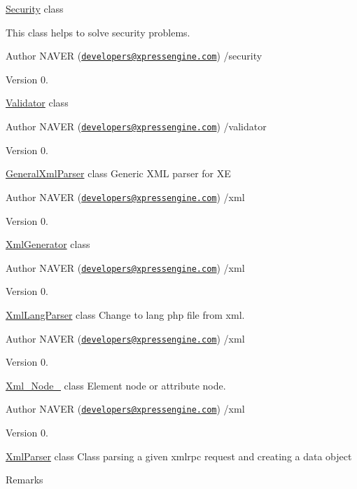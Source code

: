 \begin{DoxyItemize}
\item \hyperlink{classSecurity}{Security} class
\item This class helps to solve security problems. \begin{DoxyAuthor}{Author}
N\+A\+V\+E\+R (\href{mailto:developers@xpressengine.com}{\tt developers@xpressengine.\+com}) /security 
\end{DoxyAuthor}
\begin{DoxyVersion}{Version}
0.
\end{DoxyVersion}
\hyperlink{classValidator}{Validator} class \begin{DoxyAuthor}{Author}
N\+A\+V\+E\+R (\href{mailto:developers@xpressengine.com}{\tt developers@xpressengine.\+com}) /validator 
\end{DoxyAuthor}
\begin{DoxyVersion}{Version}
0.
\end{DoxyVersion}
\hyperlink{classGeneralXmlParser}{General\+Xml\+Parser} class Generic X\+M\+L parser for X\+E \begin{DoxyAuthor}{Author}
N\+A\+V\+E\+R (\href{mailto:developers@xpressengine.com}{\tt developers@xpressengine.\+com}) /xml 
\end{DoxyAuthor}
\begin{DoxyVersion}{Version}
0.
\end{DoxyVersion}
\hyperlink{classXmlGenerator}{Xml\+Generator} class \begin{DoxyAuthor}{Author}
N\+A\+V\+E\+R (\href{mailto:developers@xpressengine.com}{\tt developers@xpressengine.\+com}) /xml 
\end{DoxyAuthor}
\begin{DoxyVersion}{Version}
0.
\end{DoxyVersion}
\hyperlink{classXmlLangParser}{Xml\+Lang\+Parser} class Change to lang php file from xml. \begin{DoxyAuthor}{Author}
N\+A\+V\+E\+R (\href{mailto:developers@xpressengine.com}{\tt developers@xpressengine.\+com}) /xml 
\end{DoxyAuthor}
\begin{DoxyVersion}{Version}
0.
\end{DoxyVersion}
\hyperlink{classXml__Node__}{Xml\+\_\+\+Node\+\_\+} class Element node or attribute node. \begin{DoxyAuthor}{Author}
N\+A\+V\+E\+R (\href{mailto:developers@xpressengine.com}{\tt developers@xpressengine.\+com}) /xml 
\end{DoxyAuthor}
\begin{DoxyVersion}{Version}
0.
\end{DoxyVersion}
\hyperlink{classXmlParser}{Xml\+Parser} class Class parsing a given xmlrpc request and creating a data object \begin{DoxyRemark}{Remarks}


\end{DoxyRemark}
\end{DoxyItemize}
